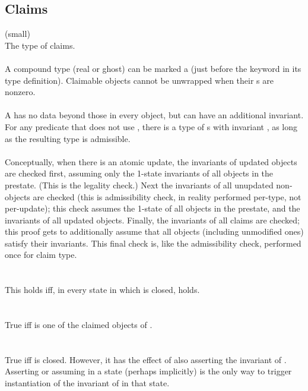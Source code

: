 \documentclass[preprint,nocopyrightspace]{sigplanconf}
\begin{document}
{{{\subsection{Claims}
\vcc{\claim} (small)\\
The type of claims. 
\\\\
A compound type (real or ghost) can be marked a  (just before
the  keyword in its type definition). Claimable objects
cannot be unwrapped when their s are nonzero.
\\\\
A \vcc{\claim} has no data beyond those in every object, but can have
an additional invariant. For any predicate  that does not
use \vcc{\old()}, there is a type of \vcc{\claim}s with
invariant , as long as the resulting type is admissible.
\\\\
Conceptually, when there is an atomic update, the invariants of
updated objects are checked first, assuming only the 1-state invariants of
all objects in the prestate. (This is the legality check.)
Next the invariants of all unupdated non-\vcc{\claim} objects are
checked (this is admissibility check, in reality performed per-type, not per-update);
this check assumes the 1-state of all objects in the
prestate, and the invariants of all updated objects. Finally, the
invariants of all claims are checked; this proof gets to additionally
assume that all objects (including unmodified ones) satisfy their invariants.
This final check is, like the admissibility check, performed once
for claim type.
\\\\
\noindent{}\\
This holds iff, in every  state in which  is
closed,  holds. 
\\\\
\noindent{}\\
True iff  is one of the claimed objects of .
\\\\
\noindent{}\\
True iff  is closed. However, it has the effect of also
asserting the invariant of . Asserting or assuming 
in a state (perhaps implicitly) is the only way to trigger
instantiation of the invariant of  in that state.
}}}
\end{document}
